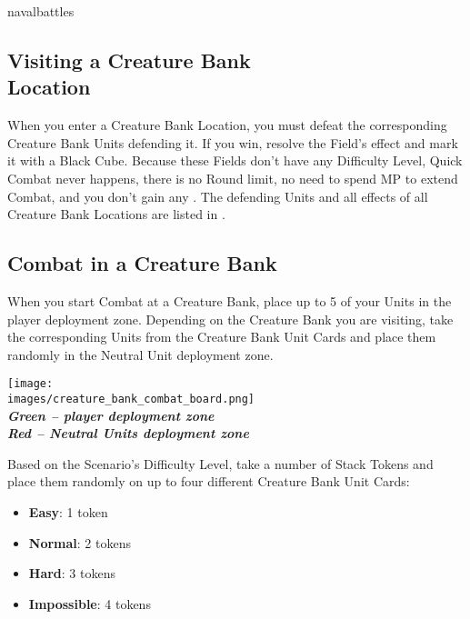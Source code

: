 \begin{expansion}[before=\vspace*{-11mm}]{navalbattles}
\begin{multicols*}{2}
  \subsection*{Visiting a Creature Bank\\Location}
  When you enter a Creature Bank Location, you must defeat the corresponding Creature Bank Units defending it.
  If you win, resolve the Field's effect and mark it with a Black Cube.
  Because these Fields don't have any Difficulty Level, Quick Combat never happens, there is no Round limit, no need to spend MP to extend Combat, and you don't gain any .
  The defending Units and all effects of all Creature Bank Locations are listed in .

  \subsection*{Combat in a Creature Bank}
  When you start Combat at a Creature Bank, place up to 5 of your Units in the player deployment zone.
  Depending on the Creature Bank you are visiting, take the corresponding Units from the Creature Bank Unit Cards and place them randomly in the Neutral Unit deployment zone.

  \bigskip
  \begin{center}
    \texttt{[image: \\images/creature\_bank\_combat\_board.png]}\\
    \textbf{\footnotesize\textit{\textcolor{darkcandyapplered}{Green -- player deployment zone}}}\\
    \textbf{\footnotesize\textit{\textcolor{darkcandyapplered}{Red -- Neutral Units deployment zone}}}\\
  \end{center}
  \bigskip

  Based on the Scenario's Difficulty Level, take a number of Stack Tokens and place them randomly on up to four different Creature Bank Unit Cards:
  \begin{itemize}
    \item \textbf{Easy}: 1 token
    \item \textbf{Normal}: 2 tokens
    \item \textbf{Hard}: 3 tokens
    \item \textbf{Impossible}: 4 tokens
  \end{itemize}

  \end{multicols*}
\end{expansion}

